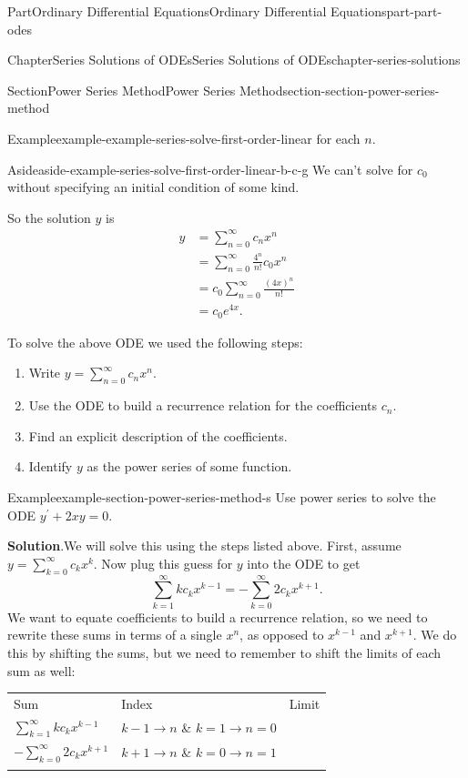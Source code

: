 \documentclass[twoside,10pt,]{book}
\newcommand{\blocktitlefont}{\relax}
\newcommand{\tabularfont}{\relax}
\numberwithin{equation}{part}
\newcommand{\hrulethick} {\noalign{\hrule height 0.11em}}
\begin{document}
\begin{partptx}{Part}{Ordinary Differential Equations}{}{Ordinary Differential Equations}{}{}{part-part-odes}
\begin{chapterptx}{Chapter}{Series Solutions of ODEs}{}{Series Solutions of ODEs}{}{}{chapter-series-solutions}
\begin{sectionptx}{Section}{Power Series Method}{}{Power Series Method}{}{}{section-section-power-series-method}
\begin{example}{Example}{}{example-example-series-solve-first-order-linear}
for each \(n\). \begin{aside}{Aside}{}{aside-example-series-solve-first-order-linear-b-c-g}%
We can't solve for \(c_{0}\) without specifying an initial condition of some kind.%
\end{aside}
 So the solution \(y\) is%
\begin{align*}
y &= \sum_{n=0}^{\infty}c_{n}x^{n}\\
&= \sum_{n=0}^{\infty}\frac{4^{n}}{n!}c_{0}x^{n}\\
&= c_{0}\sum_{n=0}^{\infty}\frac{(4x)^{n}}{n!}\\
&= c_{0}e^{4x}\text{.}
\end{align*}
%
\end{example}
To solve the above ODE we used the following steps:%
\begin{enumerate}
\item{}Write \(y = \sum_{n=0}^{\infty}c_{n}x^{n}\).%
\item{}Use the ODE to build a recurrence relation for the coefficients \(c_{n}\).%
\item{}Find an explicit description of the coefficients.%
\item{}Identify \(y\) as the power series of some function.%
\end{enumerate}
%
\begin{example}{Example}{}{example-section-power-series-method-s}%
Use power series to solve the ODE \(y^\prime+2xy=0\).%
\par\smallskip%
\noindent\textbf{\blocktitlefont Solution}.\hypertarget{solution-section-power-series-method-s-b}{}\quad{}We will solve this using the steps listed above. First, assume \(y = \sum_{k=0}^{\infty}c_{k}x^{k}\). Now plug this guess for \(y\) into the ODE to get%
\begin{equation*}
\sum_{k=1}^{\infty}kc_{k}x^{k-1} = -\sum_{k=0}^{\infty}2c_{k}x^{k+1}.
\end{equation*}
We want to equate coefficients to build a recurrence relation, so we need to rewrite these sums in terms of a single \(x^{n}\), as opposed to \(x^{k-1}\) and \(x^{k+1}\). We do this by shifting the sums, but we need to remember to shift the limits of each sum as well:%
\begin{center}%
{\tabularfont%
\begin{tabular}{lll}\hrulethick
Sum&Index&Limit\tabularnewline\hrulethick
\(\sum_{k=1}^{\infty}kc_{k}x^{k-1}\)&\(k-1\to n\) \& \(k=1\to n=0\)\tabularnewline[0pt]
\(-\sum_{k=0}^{\infty}2c_{k}x^{k+1}\)&\(k+1\to n\) \& \(k=0\to n=1\)\tabularnewline\hrulethick

\end{tabular}}
\end{center}
\end{example}
\end{sectionptx}
\end{chapterptx}
\end{partptx}
\end{document}
